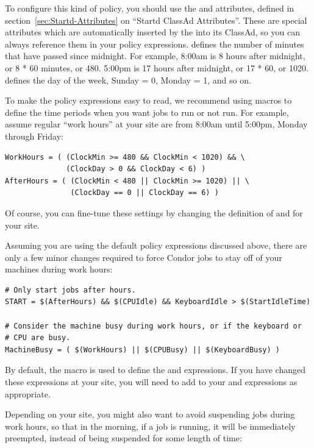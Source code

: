 To configure this kind of policy, you should use the 
and  attributes, defined in
section~\ref{sec:Startd-Attributes} on ``Startd ClassAd Attributes''.
These are special attributes which are automatically inserted by the
 into its ClassAd, so you can always reference them in
your policy expressions.
 defines the number of minutes that have passed since
midnight.  
For example, 8:00am is 8 hours after midnight, or 8 * 60 minutes, or
480.
5:00pm is 17 hours after midnight, or 17 * 60, or 1020.
 defines the day of the week, Sunday = 0, Monday = 1,
and so on.  

To make the policy expressions easy to read, we recommend using macros
to define the time periods when you want jobs to run or not run.  
For example, assume regular ``work hours'' at your site are from
8:00am until 5:00pm, Monday through Friday: 

\begin{verbatim}
WorkHours = ( (ClockMin >= 480 && ClockMin < 1020) && \
              (ClockDay > 0 && ClockDay < 6) ) 
AfterHours = ( (ClockMin < 480 || ClockMin >= 1020) || \
               (ClockDay == 0 || ClockDay == 6) )
\end{verbatim}

Of course, you can fine-tune these settings by changing the definition
of  and  for your site.

Assuming you are using the default policy expressions discussed above,
there are only a few minor changes required to force Condor jobs to
stay off of your machines during work hours:

\begin{verbatim}
# Only start jobs after hours.
START = $(AfterHours) && $(CPUIdle) && KeyboardIdle > $(StartIdleTime)

# Consider the machine busy during work hours, or if the keyboard or
# CPU are busy.
MachineBusy = ( $(WorkHours) || $(CPUBusy) || $(KeyboardBusy) )
\end{verbatim}

By default, the  macro is used to define the
 and  expressions.  
If you have changed these expressions at your site, you will need to
add \MacroUNI{WorkHours} to your \MacroNI{SUSPEND} and 
expressions as appropriate.  

Depending on your site, you might also want to avoid suspending jobs
during work hours, so that in the morning, if a job is running, it
will be immediately preempted, instead of being suspended for some
length of time:

